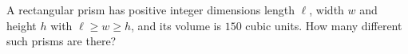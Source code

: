 A rectangular prism has positive integer dimensions length $\ell$, width $w$ and height $h$ with $\ell\ge w\ge h$, and its volume is $150$ cubic units. How many different such prisms are there?
